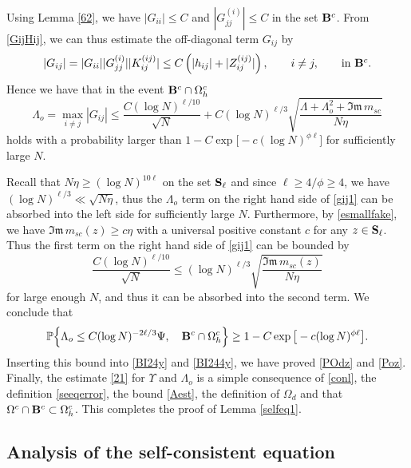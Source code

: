 \documentclass[draft]{article}
\newcommand{\be}{\begin{equation}}
\newcommand{\ee}{\end{equation}}
\newcommand{\im}{{\mathfrak{Im} \, }}
\renewcommand{\P}{{\mathbb P}}
\newcommand{\bS}{ {\bf  S}}
\newcommand{\qed}{\hfill\fbox{}\par\vspace{0.3mm}}
\numberwithin{equation}{section}
\numberwithin{theorem}{section}
\numberwithin{definition}{section}
\numberwithin{remark}{section}
\begin{document}
\medskip

Using Lemma \ref{62}, we   have $|G_{ii} |\le C$ and $|G_{jj}^{(i)}| \le C$
in the set ${\bf B}^c$. {F}rom \eqref{GijHij},
we can thus estimate  the off-diagonal term $G_{ij}$ by 
\be\label{6.4}
  |G_{ij}|  = |G_{ii}| |G_{jj}^{(i)}| |K_{ij}^{(ij)}|
  \le C\left(|h_{ij}| + |Z_{ij}^{(ij)}|\right), \qquad i\ne j, \qquad  \mbox{in ${\bf B}^c$}.
\ee
Hence we have that in the event ${\bf B}^c\cap\Omega_h^c$
\be
\Lambda_o = \max_{i \not = j} |G_{ij}|\le \frac{C(\log N)^{\ell/10} }{\sqrt{N}}+C(\log N)^{\ell/3}  \sqrt { 
\frac{ \Lambda+ \Lambda_o^2 +  {\im m_{sc}}}{N \eta}} 
\label{gij1}
\ee
holds with a probability larger than  $1- C\exp{\big[-c(\log N)^{\phi \ell } \big]}$ for sufficiently large $N$.

Recall that $N\eta\ge (\log N)^{10 \ell}$ on the set $\bS_\ell $ and
since  $\ell \ge 4/\phi\ge 4$, we have $(\log N)^{\ell/3}\ll \sqrt{N\eta}$, thus
the $\Lambda_o$ term on the right hand side of \eqref{gij1} can be absorbed into
 the left side for sufficiently large $N$.
Furthermore, 
by \eqref{esmallfake}, we have  $\im m_{sc}(z) \ge c\eta$ with
a universal positive constant $c$ for any $z\in \bS_\ell$.
 Thus   the first term on the right hand side of \eqref{gij1}  can be bounded by 
\[
\frac{C(\log N)^{\ell/10}  }{\sqrt{N}} \le    (\log N)^{\ell/3}  \sqrt { 
\frac{   {\im m_{sc}(z) }}{N \eta}}
\]
for large enough $N$, and thus it can be absorbed into  the second  term. We conclude that
\be
   \P \Big\{ \Lambda_o\le C(\log N)^{-2\ell/3}  \Psi, \quad {\bf B}^c\cap\Omega_h^c \Big\} 
  \ge  1- C\exp{\big[-c(\log N)^{\phi \ell } \big]}.
\label{conl}
\ee
  Inserting this bound into \eqref{BI24y} and
\eqref{BI244y}, 
 we have proved  \eqref{POdz} and \eqref{Poz}.
Finally, the estimate \eqref{21} 
for $\Upsilon$ and $\Lambda_o$ is a simple consequence of 
\eqref{conl}, the definition \eqref{seeqerror}, the
bound \eqref{Aest}, the
definition of $\Omega_d$  and that $\Omega^c\cap {\bf B}^c\subset \Omega_h^c$.
This completes the proof of Lemma \ref{selfeq1}.
\qed 

\subsection{Analysis of the self-consistent equation}\label{sec:selfcons}
\end{document}
